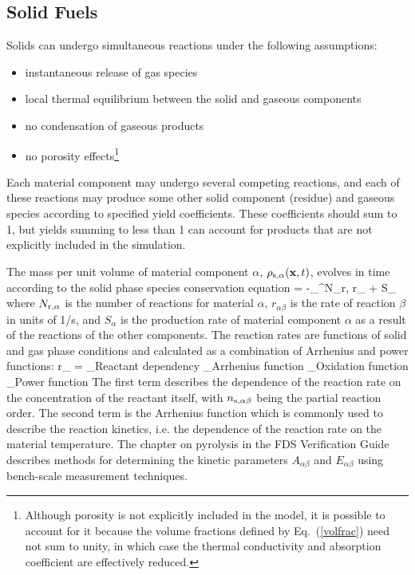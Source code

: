 \subsection{Solid Fuels}

Solids can undergo simultaneous reactions under the following assumptions:
\begin{itemize}
\setlength{\itemsep}{0.0in}
\item instantaneous release of gas species
\item local thermal equilibrium between the solid and gaseous components
\item no condensation of gaseous products
\item no porosity effects\footnote{Although porosity is not explicitly included in the model, it is possible to account for it because the volume fractions defined by Eq.~(\ref{volfrac}) need not sum to unity, in which case the thermal conductivity and absorption coefficient are effectively reduced.}
\end{itemize}
Each material component may undergo several competing reactions, and each of these reactions may produce some other solid component (residue) and gaseous species according to specified yield coefficients.  These coefficients should sum to 1, but yields summing to less than 1 can account for products that are not explicitly included in the simulation.

The mass per unit volume of material component $\alpha$, $\rho_{\rm s,\alpha}({\mathbf{x}},t)$, evolves in time according to the solid phase species conservation equation
\be
    = -\sum_{}^{N_{\rm r,\alpha}} r_{\alpha \beta} + S_\alpha
  \label{solid_species_conservation}
\ee
where $N_{\rm r,\alpha}$ is the number of reactions for material $\alpha$, $r_{\alpha \beta}$ is the rate of reaction $\beta$ in units of \si{1/s}, and $S_\alpha$ is the production rate of material component $\alpha$ as a result of the reactions of the other components. The reaction rates are functions of solid and gas phase conditions and calculated as a combination of Arrhenius and power functions:
\be
r_{\alpha \beta} =
    _\textrm{Reactant dependency}
    _\textrm{Arrhenius function}
    _\textrm{Oxidation function}
    _\textrm{Power function}
   \label{Arrhenius}
\ee
The first term describes the dependence of the reaction rate on the concentration of the reactant itself, with $n_{\rm s,\alpha\beta}$ being the partial reaction order. The second term is the Arrhenius function which is commonly used to describe the reaction kinetics, i.e. the dependence of the reaction rate on the material temperature. The chapter on pyrolysis in the FDS Verification Guide describes methods for determining the kinetic parameters $A_{\alpha \beta}$ and $E_{\alpha\beta}$ using bench-scale measurement techniques.

